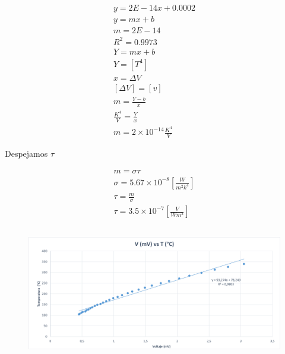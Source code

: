 \documentclass[letterpaper, 12pt]{article}
\begin{document}
\begin{equation*}
      \begin{gathered}
            y = 2E - 14x + 0.0002 \\
            y = mx + b \\
            m = 2E - 14 \\
            R^{2} = 0.9973 \\
            Y = mx + b \\
            Y = [T^4] \\
            x = \Delta V \\
            [\Delta V] = [v] \\
            m = \frac{Y - b}{x} \\
            \frac{K^4}{V} = \frac{Y}{x} \\
            m = 2 \times 10^{-14} \frac{K^{4}}{V}
      \end{gathered}
\end{equation*}

Despejamos $\tau$

\begin{equation*}
      \begin{gathered}
            m = \sigma \tau \\
            \sigma = 5.67 \times 10^{-8} [\frac{W}{m^{2} k^{4}}] \\
            \tau = \frac{m}{\sigma} \\
            \tau = 3.5 \times 10^{-7} [\frac{V}{W m^{2}}]
      \end{gathered}
\end{equation*}

\subsection{}

\begin{figure}[H]
      \begin{center}
            \includegraphics[width=\linewidth]{./Images/grafico1.png}
            \caption{}
      \end{center}
\end{figure}
\end{document}
